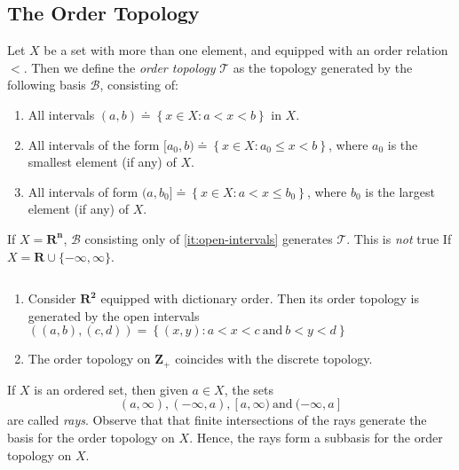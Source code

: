 \subsection{The Order Topology}
\begin{definition}
\label{def:order_top}
Let $X$ be a set with more than one element, and equipped with an order
relation $<$. Then we define the \emph{order topology} $\mathcal{T}$ as the topology
generated by the following basis $\mathcal{B}$, consisting of:
\begin{enumerate}
  \item\label{it:open-intervals} All intervals $(a,b) \doteq \left\{ x \in X:
  a < x < b
  \right\}$ in $X$.
  \item\label{it:ray1} All intervals of the form $[a_{0}, b) \doteq \left\{
  x \in X: a_{0} \le x < b \right\}$, where $a_{0}$
  is the smallest element (if any) of $X$.
  \item\label{it:ray2} All intervals of form $(a, b_{0}] \doteq \left\{
  x \in X: a < x \le b_{0} \right\}$,
  where $b_{0}$ is the largest
  element (if any) of $X$.
\end{enumerate}
\end{definition}
\begin{remark}
\label{rem:rr-top}
If $X = \mathbf{R^{n}}$, $\mathcal{B}$ consisting only of \cref{it:open-intervals}
generates $\mathcal{T}$. This is \emph{not} true If $X =
\mathbf{R} \cup
\{-\infty, \infty\}$.
\end{remark}
\begin{example}
$ $
\begin{enumerate}
  \item Consider $\mathbf{R^{2}}$ equipped with dictionary
  order. Then its order topology is generated by the open intervals
  $\left( (a,b), (c,d) \right) = \left\{ (x,y): a < x < c \ \text{and} \ b <
  y < d\right\}$
  \item The order topology on $\mathbf{Z}_{+}$ coincides with the discrete topology.
\end{enumerate}
\end{example}
\begin{definition}
\label{def:rays-subbasis}
If $X$ is an ordered set, then given $a \in X$, the sets
\begin{equation*}
(a, \infty), (-\infty, a), [a, \infty) \ \text{and} \  (-\infty, a]
\end{equation*}
are called \emph{rays}. Observe that that finite intersections of the
rays generate the basis for the order topology on $X$. Hence, the rays form a subbasis for the order topology on $X$.
\end{definition}
